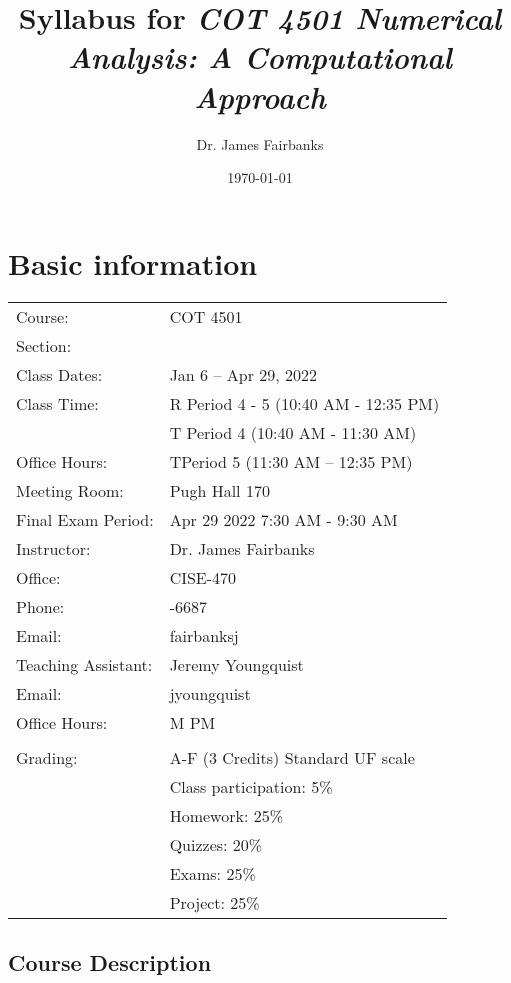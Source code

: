 \documentclass[11pt, article, oneside]{memoir}
\begin{document}
\title{\vspace{-2.5cm}Syllabus for \emph{COT 4501 Numerical Analysis: A Computational Approach}}
\author{Dr. James Fairbanks}
\date{\today}
\maketitle

\chapter{Basic information}

\vspace{.1in}

\begin{tabular}{ll}

Course:& COT 4501\\
Section:&  \\
Class Dates:&Jan 6 -- Apr 29, 2022 \\
Class Time:& R Period 4 - 5 (10:40 AM - 12:35 PM) \\
           & T Period 4 (10:40 AM - 11:30 AM) \\
Office Hours:& T\quad Period 5 (11:30 AM -- 12:35 PM)\\
Meeting Room:& Pugh Hall 170\\
Final Exam Period:& Apr 29 2022 \@ 7:30 AM - 9:30 AM\\
Instructor:& Dr. James Fairbanks\\
Office:& CISE-470\\
Phone:& -6687\\
Email:& fairbanksj\\

Teaching Assistant:& Jeremy Youngquist\\
Email: & jyoungquist\\
Office Hours: & M \quad 2 PM \\

&\\
Grading: & A-F (3 Credits) Standard UF scale\\
&Class participation: 5\%\\
&Homework: 25\%\\
&Quizzes: 20\%\\
&Exams: 25\%\\
&Project: 25\%
\end{tabular}

\section{Course Description}
\end{document}
